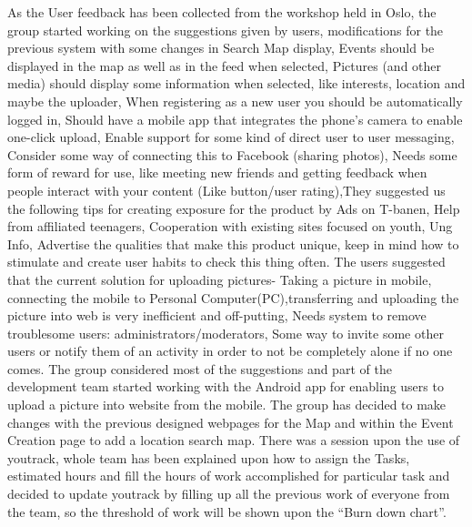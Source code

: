 As the User feedback has been collected from the workshop held in Oslo, the group started working on the suggestions given by users, modifications for the previous system with  some changes in Search Map display, Events should be displayed in the map as well as in the feed when selected, Pictures (and other media) should display some information when selected, like interests, location and maybe the uploader, When registering as a new user you should be automatically logged in, Should have a mobile app that integrates the phone’s camera to enable one-click upload, Enable support for some kind of direct user to user messaging, Consider some way of connecting this to Facebook (sharing photos), Needs some form of reward for use, like meeting new friends and getting feedback when people interact with your content (Like button/user rating),They suggested us the following tips for creating exposure for the product by
Ads on T-banen,
Help from affiliated teenagers,
Cooperation with existing sites focused on youth, Ung Info,
Advertise the qualities that make this product unique,
keep in mind how to stimulate and create user habits to check this thing often.
The users suggested that the current solution for uploading pictures-
Taking a picture in mobile, connecting the mobile to Personal Computer(PC),transferring and uploading the picture into web is very inefficient and off-putting,
Needs system to remove troublesome users: administrators/moderators,
Some way to invite some other users or notify them of an activity in order to not be completely alone if no one comes.
The group considered most of the suggestions and part of the development team started working with the Android app for enabling users to upload a picture into website from the mobile.
The group has decided to make changes with the previous designed webpages for the Map and within the Event Creation page to add a location search map.
There was a session upon the use of youtrack, whole team has been explained upon how to assign the Tasks, estimated hours and fill the hours of work accomplished for particular task and decided to update youtrack by filling up all the previous work of everyone from the team, so the threshold of work will be shown upon the “Burn down chart”.